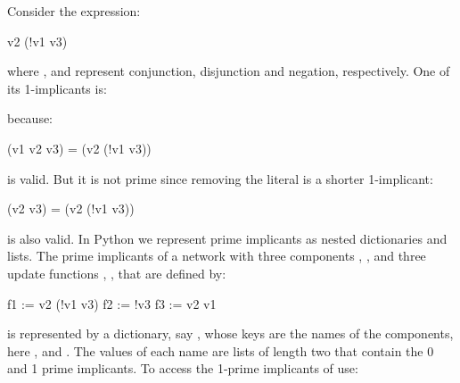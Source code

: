 \documentclass[letterpaper,10pt,english]{sphinxmanual}
\begin{document}
Consider the expression:

\begin{sphinxVerbatim}[commandchars=\\\{\}]
v2 \PYGZam{} (!v1 \textbar{} v3)
\end{sphinxVerbatim}

where \sphinxcode{\&}, \sphinxcode{\textbar{}} and \sphinxcode{!} represent conjunction, disjunction and negation, respectively.
One of its 1-implicants is:

\begin{sphinxVerbatim}[commandchars=\\\{\}]
    
\end{sphinxVerbatim}

because:

\begin{sphinxVerbatim}[commandchars=\\\{\}]
(v1 \PYGZam{} v2 \PYGZam{} v3) =\PYGZgt{} (v2 \PYGZam{} (!v1 \textbar{} v3))
\end{sphinxVerbatim}

is valid.
But it is not prime since removing the literal  is a shorter 1-implicant:

\begin{sphinxVerbatim}[commandchars=\\\{\}]
(v2 \PYGZam{} v3) =\PYGZgt{} (v2 \PYGZam{} (!v1 \textbar{} v3))
\end{sphinxVerbatim}

is also valid. In Python we represent prime implicants as nested dictionaries and lists.
The prime implicants of a network with three components , ,  and three update functions , ,  that are defined by:

\begin{sphinxVerbatim}[commandchars=\\\{\}]
f1 := v2 \PYGZam{} (!v1 \textbar{} v3)
f2 := !v3
f3 := v2 \textbar{} v1
\end{sphinxVerbatim}

is represented by a dictionary, say , whose keys are the names of the components, here ,  and .
The values of each name are lists of length two that contain the 0 and 1 prime implicants.
To access the 1-prime implicants of  use:
\end{document}
